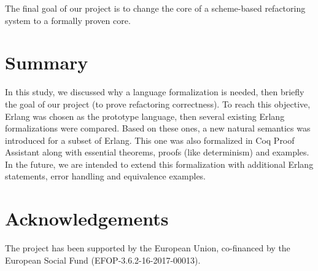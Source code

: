 \documentclass[12pt]{article}
\theoremstyle{definition}
\numberwithin{equation}{section}
\begin{document}
The final goal of our project is to change the core of a scheme-based refactoring system to a formally proven core.

\section{Summary}

In this study, we discussed why a language formalization is needed, then briefly the goal of our project (to prove refactoring correctness). To reach this objective, Erlang was chosen as the prototype language, then several existing Erlang formalizations were compared. Based on these ones, a new natural semantics was introduced for a subset of Erlang. This one was also formalized in Coq Proof Assistant along with essential theorems, proofs (like determinism) and examples. In the future, we are intended to extend this formalization with additional Erlang statements, error handling and equivalence examples.

\section*{Acknowledgements}

The project has been supported by the European Union, co-financed by the European Social  Fund  (EFOP-3.6.2-16-2017-00013).


{}

\end{document}
